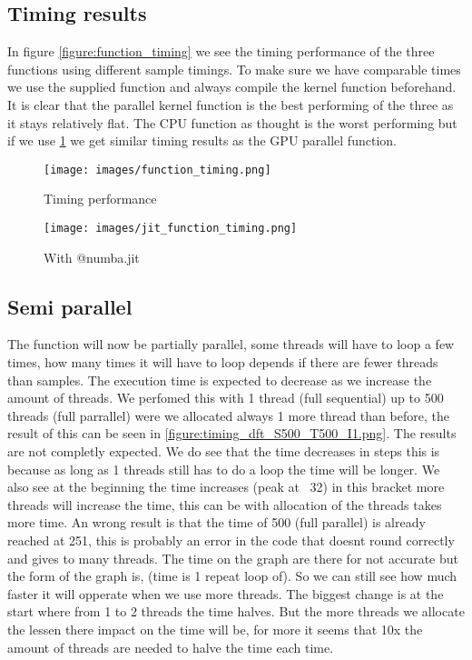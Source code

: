 \newpage

\subsection{Timing results}
\label{subsec:timing results}

In figure \ref{figure:function_timing} we see the timing performance of the three functions using different sample timings. To make sure we have comparable times we use the supplied  function and always compile the kernel function beforehand. It is clear that the parallel kernel function is the best performing of the three as it stays relatively flat.
The CPU function as thought is the worst performing but if we use  \ref{figure:jit_function_timing} we get similar timing results as the GPU parallel function.

\begin{figure}[!htb]
    \centering
    \begin{minipage}[t]{0.45\linewidth}
        \texttt{[image: images/function\_timing.png]}
        \caption{Timing performance}
        \label{figure:function_timing}
    \end{minipage}
    \begin{minipage}[t]{0.45\linewidth}
        \texttt{[image: images/jit\_function\_timing.png]}
        \caption{With @numba.jit}
        \label{figure:jit_function_timing}
    \end{minipage}
\end{figure}

\subsection{Semi parallel}
\label{subsec:semiparallel}
The function will now be partially parallel, some threads will have to loop a few times, how many times it will have to loop depends if there are fewer threads than samples. The execution time is expected to decrease as we increase the amount of threads. We perfomed this with 1 thread (full sequential) up to 500 threads (full parrallel) were we allocated always 1 more thread than before, the result of this can be seen in \ref{figure:timing_dft_S500_T500_I1.png}.
The results are not completly expected. We do see that the time decreases in steps this is because as long as 1 threads still has to do a loop the time will be longer. We also see at the beginning the time increases (peak at ~32) in this bracket more threads will increase the time, this can be with allocation of the threads takes more time. An wrong result is that the time of 500 (full parallel) is already reached at 251, this is probably an error in the code that doesnt round correctly and gives to many threads. The time on the graph are there for not accurate but the form of the graph is, (time is 1 repeat loop of).
So we can still see how much faster it will opperate when we use more threads. The biggest change is at the start where from 1 to 2 threads the time halves. But the more threads we allocate the lessen there impact on the time will be, for more it seems that 10x the amount of threads are needed to halve the time each time.


